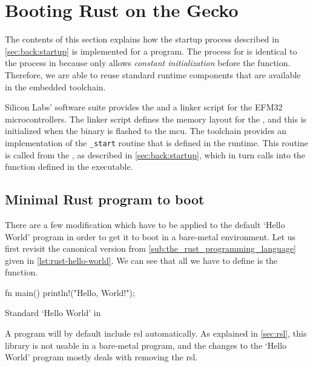 \section{Booting Rust on the Gecko}
\label{sec:impl:booting}

The contents of this section explains how the startup process described in \autoref{sec:back:startup} is implemented for a {\rust} program.
The process for {\rust} is identical to the process in {\C} because {\rust} only allows \emph{constant initialization} before the {\main} function.
Therefore, we are able to reuse standard runtime components that are available in the {\C} embedded toolchain.

Silicon Labs' software suite provides the  and a linker script for the EFM32 microcontrollers.
The linker script defines the memory layout for the {\gecko}, and this is initialized when the  binary is flashed to the \gls{mcu}.
The {\armgcc} toolchain provides an implementation of the \texttt{\_start} routine that is defined in the {\C} runtime.
This routine is called from the {}, as described in \autoref{sec:back:startup}, which in turn calls into the  function defined in the {\rust} executable.

\subsection{Minimal Rust program to boot}
\label{ssec:minimal_rust_program_to_boot}

There are a few modification which have to be applied to the default `Hello World' program in order to get it to boot in a bare-metal environment.
Let us first revisit the canonical version from \autoref{sub:the_rust_programming_language} given in \autoref{lst:rust-hello-world}.
We can see that all we have to define is the  function.

\begin{listing}[H]
  \begin{rustcode}
fn main() {
  println!("Hello, World!");
}
  \end{rustcode}
  \caption{Standard `Hello World' in {\rust}}
  \label{lst:rust-hello-world}
\end{listing}

A {\rust} program will by default include \glsdesc{rsl} automatically.
As explained in \autoref{sec:rsl}, this library is not usable in a bare-metal program, and the changes to the `Hello World' program mostly deals with removing the \gls{rsl}.

